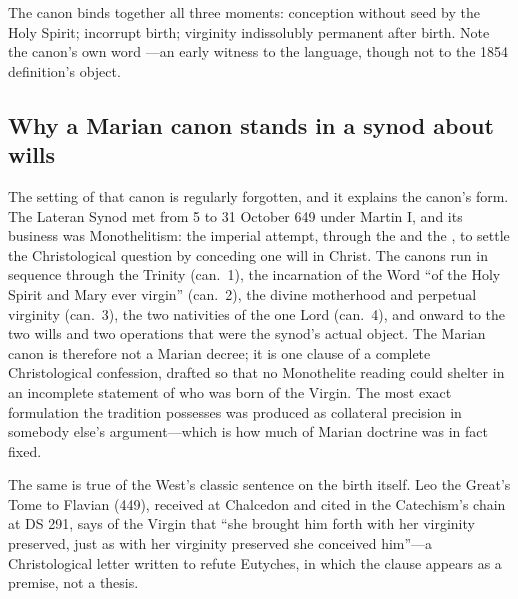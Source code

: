 The canon binds together all three moments: conception without seed by
the Holy Spirit; incorrupt birth; virginity indissolubly permanent after
birth. Note the canon's own word ---an early witness to
the language, though not to the 1854 definition's object.

\subsection*{Why a Marian canon stands in a synod about wills}

The setting of that canon is regularly forgotten, and it explains the
canon's form. The Lateran Synod met from 5 to 31 October 649 under Martin
I, and its business was Monothelitism: the imperial attempt, through the
 and the , to settle the Christological
question by conceding one will in Christ. The canons run in sequence
through the Trinity (can.~1), the incarnation of the Word ``of the Holy
Spirit and Mary ever virgin'' (can.~2), the divine motherhood and
perpetual virginity (can.~3), the two nativities of the one Lord
(can.~4), and onward to the two wills and two operations that were the
synod's actual object. The Marian canon is therefore not a Marian decree; it is one
clause of a complete Christological confession, drafted so that no
Monothelite reading could shelter in an incomplete statement of who was
born of the Virgin. The most exact formulation the tradition possesses
was produced as collateral precision in somebody else's argument---which
is how much of Marian doctrine was in fact fixed.

The same is true of the West's classic sentence on the birth itself. Leo
the Great's Tome to Flavian (449), received at Chalcedon and cited in the
Catechism's chain at DS 291, says of the Virgin that ``she brought him
forth with her virginity preserved, just as with her virginity preserved
she conceived him''---a Christological letter written to refute Eutyches,
in which the  clause appears as a premise, not a
thesis.

